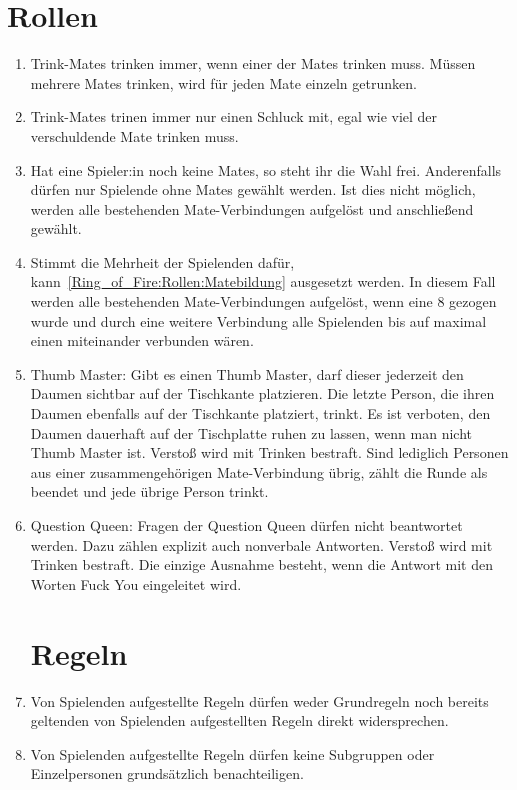 \section{Rollen}
\begin{enumerate}[label={(\arabic*)}]
	\item
	Trink-Mates trinken immer, wenn einer der Mates trinken muss.
	Müssen mehrere Mates trinken, wird für jeden Mate einzeln getrunken.
	
	\item
	Trink-Mates trinen immer nur einen Schluck mit, egal wie viel der verschuldende Mate trinken muss.

	\item\label{Ring_of_Fire:Rollen:Matebildung}
	Hat eine Spieler:in noch keine Mates, so steht ihr die Wahl frei.
	Anderenfalls dürfen nur Spielende ohne Mates gewählt werden.
	Ist dies nicht möglich, werden alle bestehenden Mate-Verbindungen aufgelöst und anschließend gewählt.
	
	\item
	Stimmt die Mehrheit der Spielenden dafür, kann~\ref{Ring_of_Fire:Rollen:Matebildung} ausgesetzt werden.
	In diesem Fall werden alle bestehenden Mate-Verbindungen aufgelöst, wenn eine 8 gezogen wurde und durch eine weitere Verbindung alle Spielenden bis auf maximal einen miteinander verbunden wären.
	
	\item\label{Ring_of_Fire:Rollen:Thumb_Master}
	Thumb Master: Gibt es einen Thumb Master, darf dieser jederzeit den Daumen sichtbar auf der Tischkante platzieren.
	Die letzte Person, die ihren Daumen ebenfalls auf der Tischkante platziert, trinkt.
	Es ist verboten, den Daumen dauerhaft auf der Tischplatte ruhen zu lassen, wenn man nicht Thumb Master ist.
	Verstoß wird mit Trinken bestraft.
	Sind lediglich Personen aus einer zusammengehörigen Mate-Verbindung übrig, zählt die Runde als beendet und jede übrige Person trinkt.
	
	\item\label{Ring_of_Fire:Rollen:Question_Queen}
	Question Queen: Fragen der Question Queen dürfen nicht beantwortet werden.
	Dazu zählen explizit auch nonverbale Antworten. Verstoß wird mit Trinken bestraft.
	Die einzige Ausnahme besteht, wenn die Antwort mit den Worten \glqq{}Fuck You\grqq{} eingeleitet wird.

\section{Regeln}\label{Ring_of_Fire:Regeln}
	\item
	Von Spielenden aufgestellte Regeln dürfen weder Grundregeln noch bereits geltenden von Spielenden aufgestellten Regeln direkt widersprechen.
	
	\item
	Von Spielenden aufgestellte Regeln dürfen keine Subgruppen oder Einzelpersonen grundsätzlich benachteiligen.
\end{enumerate}
